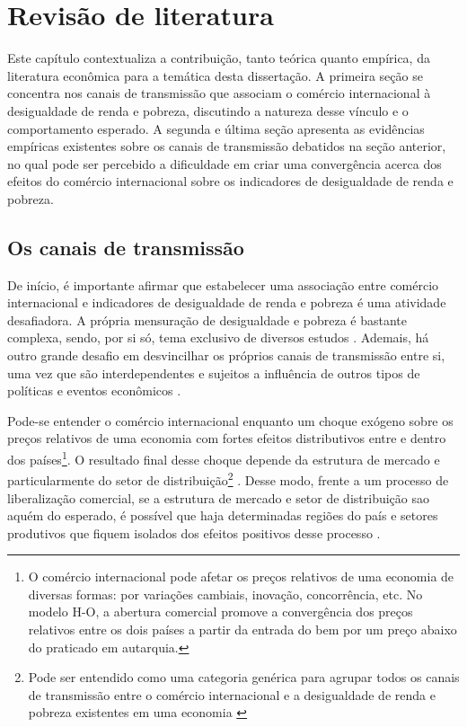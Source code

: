 

\chapter{Revisão de literatura}\label{cha:revisao_de_literatura}

Este capítulo contextualiza a contribuição, tanto teórica quanto empírica, da literatura econômica para a temática desta dissertação. A primeira seção se concentra nos canais de transmissão que associam o comércio internacional à desigualdade de renda e pobreza, discutindo a natureza desse vínculo e o comportamento esperado. A segunda e última seção apresenta as evidências empíricas existentes sobre os canais de transmissão debatidos na seção anterior, no qual pode ser percebido a dificuldade em criar uma convergência acerca dos efeitos do comércio internacional sobre os indicadores de desigualdade de renda e pobreza.



\section{Os canais de transmissão}\label{sec:canais_de_transmissao}

De início, é importante afirmar que estabelecer uma associação entre comércio internacional e indicadores de desigualdade de renda e pobreza é uma atividade desafiadora. A própria mensuração de desigualdade e pobreza é bastante complexa, sendo, por si só, tema exclusivo de diversos estudos \cite{neri06, soares09, hoffmann19}. Ademais, há outro grande desafio em desvincilhar os próprios canais de transmissão entre si, uma vez que são interdependentes e sujeitos a influência de outros tipos de políticas e eventos econômicos \cite{bannisterthugge01}.

Pode-se entender o comércio internacional enquanto um choque exógeno sobre os preços relativos de uma economia com fortes efeitos distributivos entre e dentro dos países\footnote{O comércio internacional pode afetar os preços relativos de uma economia de diversas formas: por variações cambiais, inovação, concorrência, etc. No modelo H-O, a abertura comercial promove a convergência dos preços relativos entre os dois países a partir da entrada do bem por um preço abaixo do praticado em autarquia.}. O resultado final desse choque depende da estrutura de mercado e particularmente do setor de distribuição\footnote{Pode ser entendido como uma categoria genérica para agrupar todos os canais de transmissão entre o comércio internacional e a desigualdade de renda e pobreza existentes em uma economia \cite{winters02}} \cite{winters02}. Desse modo, frente a um processo de liberalização comercial, se a estrutura de mercado e setor de distribuição sao aquém do esperado, é possível que haja determinadas regiões do país e setores produtivos que fiquem isolados dos efeitos positivos desse processo \cite{bannisterthugge01}.

